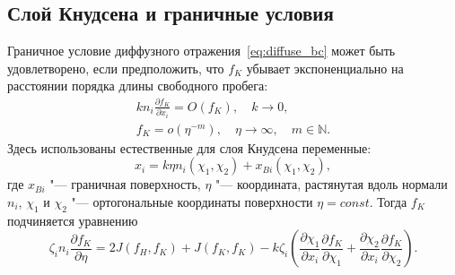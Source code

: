 \documentclass[
aps,%
12pt,%
final,%
notitlepage,%
oneside,%
onecolumn,%
nobibnotes,%
nofootinbib,%
superscriptaddress,%
noshowpacs,%
showkeys,%
floatfix,%
tightenlines,%
centertags]%
{revtex4}
\newcommand{\pder}[2][]{\frac{\partial#1}{\partial#2}}
\newcommand{\OO}[1]{O(#1)}
\newcommand{\oo}[1]{o(#1)}
\begin{document}
\subsection{Слой Кнудсена и граничные условия}

Граничное условие диффузного отражения~\eqref{eq:diffuse_bc} может быть удовлетворено,
если предположить, что \(f_K\) убывает экспоненциально на расстоянии порядка длины свободного пробега:
\begin{gather}
    k n_i\pder[f_K]{x_i} = \OO{f_K}, \quad k\to0, \label{eq:knlayer_sharp}\\
    f_K = \oo{\eta^{-m}}, \quad \eta\to\infty, \quad m\in\mathbb{N}. \label{eq:knlayer_exp}
\end{gather}
Здесь использованы естественные для слоя Кнудсена переменные:
\begin{equation}\label{eq:eta_definition}
    x_i = k\eta n_i(\chi_1,\chi_2) + x_{Bi}(\chi_1,\chi_2),
\end{equation}
где \(x_{Bi}\) "--- граничная поверхность, \(\eta\) "--- координата, растянутая вдоль нормали \(n_i\),
\(\chi_1\) и \(\chi_2\) "--- ортогональные координаты поверхности \(\eta=const\).
Тогда \(f_K\) подчиняется уравнению
\begin{equation}\label{eq:fK_equation}
    \zeta_in_i\pder[f_K]{\eta} = 2J(f_H,f_K) + J(f_K,f_K)
    - k\zeta_i\left(\pder[\chi_1]{x_i}\pder[f_K]{\chi_1} + \pder[\chi_2]{x_i}\pder[f_K]{\chi_2}\right).
\end{equation}
\end{document}
